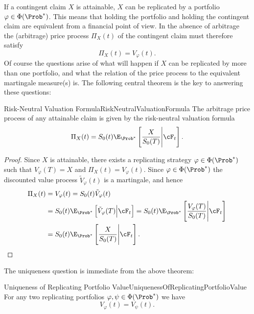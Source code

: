 If a contingent claim $X$ is attainable, $X$ can be replicated by a portfolio $\varphi \in \Phi(\Prob^*)$. This means that holding the portfolio and holding the contingent claim are equivalent from a financial point of view. In the absence of arbitrage the (arbitrage) price process $\Pi_X(t)$ of the contingent claim must therefore satisfy
\[
	\Pi_X(t) = V_{\varphi}(t).
\]
Of course the questions arise of what will happen if $X$ can be replicated by more than one portfolio, and what the relation of the price process to the equivalent martingale measure(s) is. The following central theorem is the key to answering these questions:

\begin{thm}{Risk-Neutral Valuation Formula}{RiskNeutralValuationFormula}
	The arbitrage price process of any attainable claim is given by the risk-neutral valuation formula
	\begin{equation}
		\Pi_X(t) = S_0(t)\E_{\Prob^*} \left[ \frac{X}{S_0(T)} \Bigg| \cF_t \right].
	\end{equation}
\end{thm}

\begin{proof}
	Since $X$ is attainable, there exists a replicating strategy $\varphi \in \Phi(\Prob^*)$ such that $V_{\varphi}(T) = X$ and $\Pi_X(t) = V_{\varphi}(t)$. Since $\varphi \in \Phi(\Prob^*)$ the discounted value process $\tilde{V}_{\varphi}(t)$ is a martingale, and hence
	\begin{align*}
		\Pi_X(t) & = V_{\varphi}(t) = S_0(t)\tilde{V}_{\varphi}(t)                                                                                                       \\
		         & = S_0(t)\E_{\Prob^*} \left[ \tilde{V}_{\varphi}(T) \Big| \cF_t \right] = S_0(t)\E_{\Prob^*} \left[ \frac{V_{\varphi}(T)}{S_0(T)} \Bigg| \cF_t \right] \\
		         & = S_0(t)\E_{\Prob^*} \left[ \frac{X}{S_0(T)} \Bigg| \cF_t \right].
	\end{align*}
\end{proof}

The uniqueness question is immediate from the above theorem:

\begin{cor}{Uniqueness of Replicating Portfolio Value}{UniquenessOfReplicatingPortfolioValue}
	For any two replicating portfolios $\varphi, \psi \in \Phi(\Prob^*)$ we have
	\[
		V_{\varphi}(t) = V_{\psi}(t).
	\]
\end{cor}

